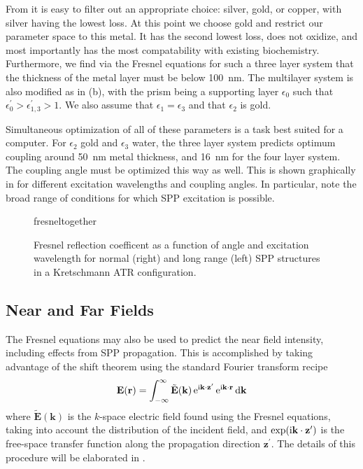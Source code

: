 From  it is easy to filter out an appropriate
choice: silver, gold, or copper, with silver having the lowest loss.  At
this point we choose gold and restrict our parameter space to this metal.
It has the second lowest loss, does not oxidize, and most importantly has
the most compatability with existing biochemistry.  Furthermore, we find
via the Fresnel equations for such a three layer system that the thickness
of the metal layer must be below \SI{100}{\nano\meter}.  The multilayer
system is also modified as in (b), with the
prism being a supporting layer $\epsilon_0$ such that
$\epsilon^\prime_0>\epsilon^\prime_{1,3}>1$.  We also assume that
$\epsilon_1=\epsilon_3$ and that $\epsilon_2$ is gold.

Simultaneous optimization of all of these parameters is a task best suited
for a computer.  For $\epsilon_2$ gold and $\epsilon_3$ water, the three
layer system predicts optimum coupling around \SI{50}{\nano\meter} metal
thickness, and \SI{16}{\nano\meter} for the four layer system.  The
coupling angle must be optimized this way as well.  This is shown
graphically in  for different excitation
wavelengths and coupling angles.  In particular, note the broad range of
conditions for which SPP excitation is possible.
\begin{figure}[ht]
\centering
{fresneltogether}
\caption{Fresnel reflection coefficent as a function of angle and
excitation wavelength for normal (right) and long range (left) SPP structures in a Kretschmann ATR 
configuration.}
\label{fig:fresnelangle}
\end{figure}

\subsection{Near and Far Fields}
The Fresnel equations may also be used to predict the near field intensity,
including effects from SPP propagation.  This is accomplished by taking
advantage of the shift theorem using the standard Fourier transform recipe
\begin{equation}
\mathbf{E}(\mathbf{r}) = \int_{-\infty}^{\infty} \tilde{\mathbf{E}}(\mathbf{k})
\,{\mathrm{e}}^{{\mathrm{i}} \mathbf{k} \cdot \mathbf{z}^\prime}
\,{\mathrm{e}}^{{\mathrm{i}} \mathbf{k} \cdot \mathbf{r}}\,\mathrm{d} \mathbf{k}
\end{equation}
where $\tilde{\mathbf{E}}(\mathbf{k})$ is the $k$-space electric field
found using the Fresnel equations, taking into account the distribution of
the incident field, and $\exp({\mathrm{i}} \mathbf{k} \cdot
\mathbf{z}^\prime)$ is the free-space transfer function along the 
propagation direction $\mathbf{z}^\prime$.  The details of this procedure
will be elaborated in .  

